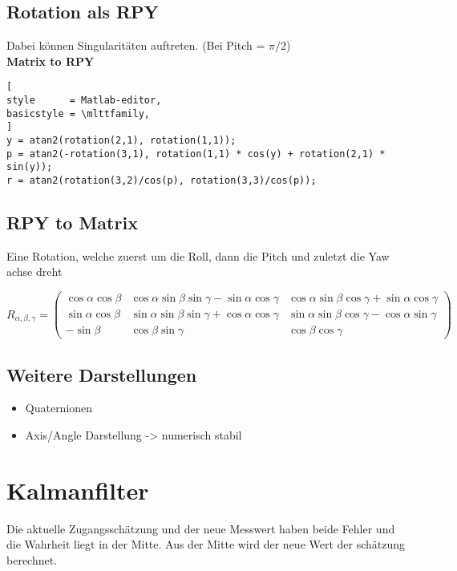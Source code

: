 \subsection{Rotation als RPY}
Dabei können Singularitäten auftreten. (Bei Pitch = $\pi/2 $) \\
	\textbf{Matrix to RPY}
\begin{lstlisting}[
style      = Matlab-editor,
basicstyle = \mlttfamily,
]
y = atan2(rotation(2,1), rotation(1,1));
p = atan2(-rotation(3,1), rotation(1,1) * cos(y) + rotation(2,1) * sin(y));
r = atan2(rotation(3,2)/cos(p), rotation(3,3)/cos(p));
\end{lstlisting} 

\subsection{RPY to Matrix}
Eine Rotation, welche zuerst um die Roll, dann die Pitch und zuletzt die Yaw achse dreht

\begin{equation}
R_{\alpha, \beta, \gamma} %
=
\left(
\begin{array}{ccc}
\cos{\alpha}\cos{\beta} & \cos{\alpha}\sin{\beta}\sin{\gamma} - \sin{\alpha}\cos{\gamma}  & \cos{\alpha}\sin{\beta}\cos{\gamma} + \sin{\alpha}\cos{\gamma} \\
\sin{\alpha}\cos{\beta} & \sin{\alpha}\sin{\beta}\sin{\gamma} + \cos{\alpha}\cos{\gamma} & \sin{\alpha}\sin{\beta}\cos{\gamma} - \cos{\alpha}\sin{\gamma}  \\
-\sin{\beta}	   & \cos{\beta}\sin{\gamma}    &   \cos{\beta}\cos{\gamma}
\end{array}
\right)	
\end{equation}


\subsection{Weitere Darstellungen}
\begin{itemize}
	\item Quaternionen
	\item Axis/Angle Darstellung -> numerisch stabil
\end{itemize}

\section{Kalmanfilter}
\label{sec:faq:kap3}

Die aktuelle Zugangsschätzung und der neue Messwert haben beide Fehler und die Wahrheit liegt in der Mitte. Aus der Mitte wird der neue Wert der schätzung berechnet.


